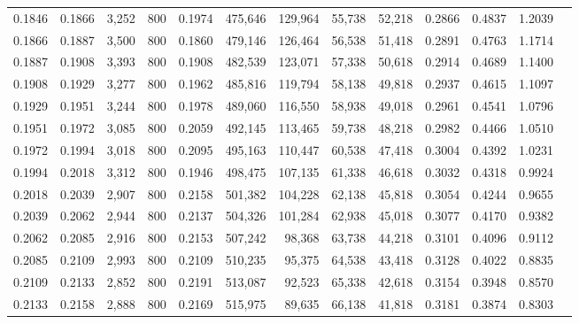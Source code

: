\begin{tabular}{rrrrrrrrrrrrr}
0.1846 & 0.1866 &  3,252 & 800 &                                     0.1974 & 475,646 & 129,964 &  55,738 &  52,218 & 0.2866 & 0.4837 & 1.2039 \\
0.1866 & 0.1887 &  3,500 & 800 &                                     0.1860 & 479,146 & 126,464 &  56,538 &  51,418 & 0.2891 & 0.4763 & 1.1714 \\
0.1887 & 0.1908 &  3,393 & 800 &                                     0.1908 & 482,539 & 123,071 &  57,338 &  50,618 & 0.2914 & 0.4689 & 1.1400 \\
0.1908 & 0.1929 &  3,277 & 800 &                                     0.1962 & 485,816 & 119,794 &  58,138 &  49,818 & 0.2937 & 0.4615 & 1.1097 \\
0.1929 & 0.1951 &  3,244 & 800 &                                     0.1978 & 489,060 & 116,550 &  58,938 &  49,018 & 0.2961 & 0.4541 & 1.0796 \\
0.1951 & 0.1972 &  3,085 & 800 &                                     0.2059 & 492,145 & 113,465 &  59,738 &  48,218 & 0.2982 & 0.4466 & 1.0510 \\
0.1972 & 0.1994 &  3,018 & 800 &                                     0.2095 & 495,163 & 110,447 &  60,538 &  47,418 & 0.3004 & 0.4392 & 1.0231 \\
0.1994 & 0.2018 &  3,312 & 800 &                                     0.1946 & 498,475 & 107,135 &  61,338 &  46,618 & 0.3032 & 0.4318 & 0.9924 \\
0.2018 & 0.2039 &  2,907 & 800 &                                     0.2158 & 501,382 & 104,228 &  62,138 &  45,818 & 0.3054 & 0.4244 & 0.9655 \\
0.2039 & 0.2062 &  2,944 & 800 &                                     0.2137 & 504,326 & 101,284 &  62,938 &  45,018 & 0.3077 & 0.4170 & 0.9382 \\
0.2062 & 0.2085 &  2,916 & 800 &                                     0.2153 & 507,242 &  98,368 &  63,738 &  44,218 & 0.3101 & 0.4096 & 0.9112 \\
0.2085 & 0.2109 &  2,993 & 800 &                                     0.2109 & 510,235 &  95,375 &  64,538 &  43,418 & 0.3128 & 0.4022 & 0.8835 \\
0.2109 & 0.2133 &  2,852 & 800 &                                     0.2191 & 513,087 &  92,523 &  65,338 &  42,618 & 0.3154 & 0.3948 & 0.8570 \\
0.2133 & 0.2158 &  2,888 & 800 &                                     0.2169 & 515,975 &  89,635 &  66,138 &  41,818 & 0.3181 & 0.3874 & 0.8303 \\

\end{tabular}
